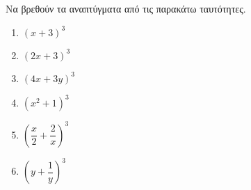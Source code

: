 Να βρεθούν τα αναπτύγματα από τις παρακάτω ταυτότητες.
\begin{multicols}{3}
\begin{enumerate}[label=\roman*.]
\item $ \left(x+3 \right)^3 $
\item $ \left(2x+3 \right)^3 $
\item $ \left(4x+3y \right)^3 $
\item $ \left(x^2+1 \right)^3 $
\item $ \left(\dfrac{x}{2}+\dfrac{2}{x} \right)^3 $
\item $ \left(y+\dfrac{1}{y}\right)^3 $
\end{enumerate}
\end{multicols}
